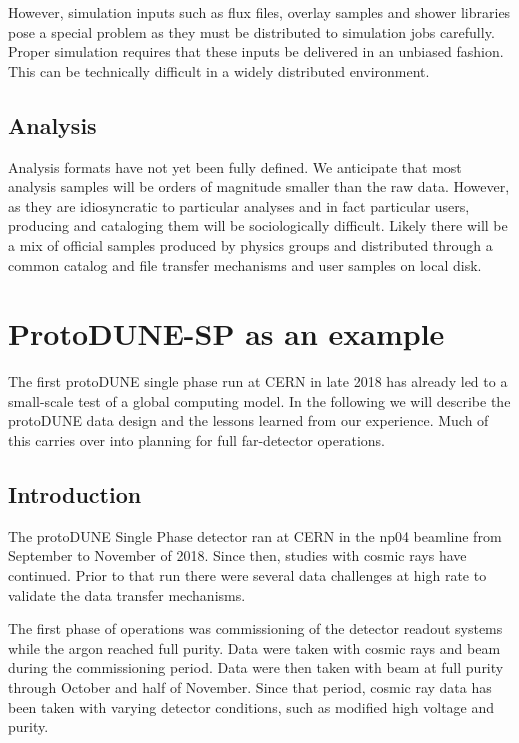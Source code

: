 However, simulation inputs such as flux files, overlay samples and shower libraries pose a special problem as they must be distributed to simulation jobs carefully.  Proper simulation requires that these inputs be delivered in an unbiased fashion. This can be technically difficult in a widely distributed environment. 

\subsection{Analysis}

Analysis formats have not yet been fully defined.  We anticipate that most analysis samples will be orders of magnitude smaller than the raw data.  However, as they are idiosyncratic to particular analyses and in fact particular users,  producing and cataloging them will be sociologically difficult. 
Likely there will be a mix of official samples  produced by physics groups and distributed through a common catalog and file transfer mechanisms and user samples on local disk. 


\section{ProtoDUNE-SP as an example}		
\label{ch:exec-comp-proto-SP}
The first protoDUNE single phase run at CERN in late 2018 has already led to a small-scale test of a global computing model.  In the following we will describe the protoDUNE data design and the lessons learned from our experience. Much of this carries over into planning for full far-detector operations. 

\subsection{Introduction}

The protoDUNE Single Phase detector ran at CERN in the np04 beamline from September to November of 2018. Since then, studies with cosmic rays have continued. Prior to that run there were several data challenges at high rate to validate the data transfer mechanisms. 

The first phase of operations was commissioning of the detector readout systems while the argon reached full purity.  Data were taken with cosmic rays and beam during the commissioning period.  Data were then taken with beam at full purity through October and half of November.  Since that period, cosmic ray data has been taken with varying detector conditions, such as modified high voltage and purity. 



